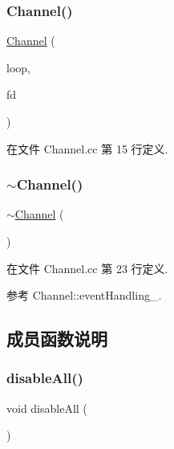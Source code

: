 \subsubsection{\texorpdfstring{Channel()}{Channel()}}
{\footnotesize\ttfamily \hyperlink{classmuduo_1_1Channel}{Channel} (\begin{DoxyParamCaption}\item[{\hyperlink{classmuduo_1_1EventLoop}{Event\+Loop} $\ast$}]{loop,  }\item[{int}]{fd }\end{DoxyParamCaption})}



在文件 Channel.\+cc 第 15 行定义.

\mbox{\label{classmuduo_1_1Channel_aad279ec58dddf879ac20651fceffd4cf}} 
\subsubsection{\texorpdfstring{$\sim$\+Channel()}{~Channel()}}
{\footnotesize\ttfamily $\sim$\hyperlink{classmuduo_1_1Channel}{Channel} (\begin{DoxyParamCaption}{ }\end{DoxyParamCaption})}



在文件 Channel.\+cc 第 23 行定义.



参考 Channel\+::event\+Handling\+\_\+.



\subsection{成员函数说明}
\mbox{\label{classmuduo_1_1Channel_a238885c747f586049b766fa4fcd5ec12}} 
\subsubsection{\texorpdfstring{disable\+All()}{disableAll()}}
{\footnotesize\ttfamily void disable\+All (\begin{DoxyParamCaption}{ }\end{DoxyParamCaption})\hspace{0.3cm}{\ttfamily [inline]}}



